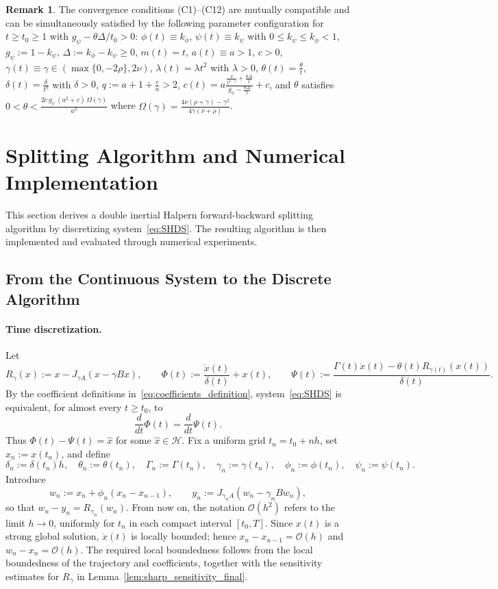\documentclass{article}
\theoremstyle{definition}
\theoremstyle{definition}
\theoremstyle{definition}
\newtheorem{remark}{Remark}[section]
\begin{document}
\begin{remark}
\label{sec:Analysis of Parameter Conditions}
The convergence conditions {\rm (C1)}--{\rm (C12)} are mutually compatible and can be simultaneously satisfied by the following parameter configuration for $t \ge t_0 \ge 1$ with $g_{\psi}-\theta\Delta/t_0>0$: 
$\phi(t)\equiv k_{\phi}$, $\psi(t)\equiv k_{\psi}$ with $0\le k_{\psi}\le k_{\phi}<1$, 
$g_{\psi}:=1-k_{\psi}$, $\Delta:=k_{\phi}-k_{\psi}\ge 0$, 
$m(t)=t$, $a(t)\equiv a>1$, $c>0$, 
$\gamma(t)\equiv\gamma\in(\max\{0,-2\rho\},2\nu)$, 
$\lambda(t)=\lambda t^{2}$ with $\lambda>0$, 
$\theta(t)=\frac{\theta}{t}$, 
$\delta(t)=\frac{\delta}{t^{q}}$ with $\delta>0$, 
$q:=a+1+\frac{c}{a}>2$, 
$c(t)=a\frac{\frac{\delta}{t^{q-1}}+\frac{\theta\Delta}{t}}{g_{\psi}-\frac{\theta\Delta}{t}}+c$, and
$\theta$ satisfies $0<\theta<\frac{2c\,g_{\psi}\,(a^{2}+c)\,\Omega(\gamma)}{a^{3}}$ where $\Omega(\gamma)=\frac{4\nu(\rho+\gamma)-\gamma^{2}}{4\gamma(\nu+\rho)}$.
\end{remark}

\section{Splitting Algorithm and Numerical Implementation}
\label{sec:algorithm}
This section derives a double inertial Halpern forward-backward splitting algorithm by discretizing system~\eqref{eq:SHDS}. The resulting algorithm is then implemented and evaluated through numerical experiments.

\subsection{From the Continuous System to the Discrete Algorithm}
\paragraph{Time discretization.}
Let
\[
R_{\gamma}(x):=x-J_{\gamma A}(x-\gamma Bx), \qquad
\Phi(t):=\frac{\dot{x}(t)}{\delta(t)}+x(t), \qquad
\Psi(t):=\frac{\Gamma(t)\dot{x}(t)-\theta(t)R_{\gamma(t)}(x(t))}{\delta(t)}.
\]
By the coefficient definitions in~\eqref{eq:coefficients_definition}, system~\eqref{eq:SHDS} is equivalent, for almost every \(t\ge t_0\), to
\[
\frac{d}{dt}\Phi(t)=\frac{d}{dt}\Psi(t).
\]
Thus \(\Phi(t)-\Psi(t)=\hat{x}\) for some \(\hat{x}\in\mathcal H\). Fix a uniform grid \(t_n=t_0+nh\), set \(x_n:=x(t_n)\), and define
\[
\delta_n:=\delta(t_n)h,\quad
\theta_n:=\theta(t_n),\quad
\Gamma_n:=\Gamma(t_n),\quad
\gamma_n:=\gamma(t_n),\quad
\phi_n:=\phi(t_n),\quad
\psi_n:=\psi(t_n).
\]
Introduce
\[
w_n:=x_n+\phi_n(x_n-x_{n-1}),\qquad
y_n:=J_{\gamma_n A}(w_n-\gamma_n B w_n),
\]
so that \(w_n-y_n=R_{\gamma_n}(w_n)\). From now on, the notation \(\mathcal O(h^2)\) refers to the limit \(h\to0\), uniformly for \(t_n\) in each compact interval \([t_0,T]\). Since \(x(t)\) is a strong global solution, \(\dot{x}(t)\) is locally bounded; hence \(x_n-x_{n-1}=\mathcal O(h)\) and \(w_n-x_n=\mathcal O(h)\). The required local boundedness follows from the local boundedness of the trajectory and coefficients, together with the sensitivity estimates for \(R_\gamma\) in Lemma~\ref{lem:sharp_sensitivity_final}.
\end{document}
